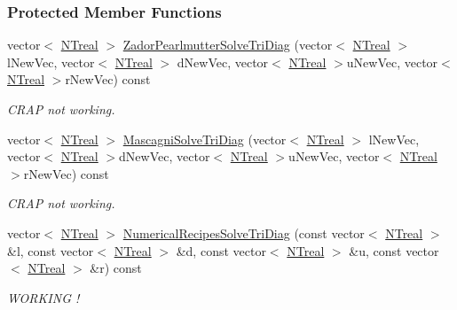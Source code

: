 \subsubsection*{Protected Member Functions}
\begin{DoxyCompactItemize}
\item 
vector$<$ \hyperlink{nt__types_8h_a814a97893e9deb1eedcc7604529ba80d}{NTreal} $>$ \hyperlink{class_n_t_b_p__membrane__compartment__sequence__o_a5d4fd9e3050991c450b24c7ff21dd1b6}{ZadorPearlmutterSolveTriDiag} (vector$<$ \hyperlink{nt__types_8h_a814a97893e9deb1eedcc7604529ba80d}{NTreal} $>$ lNewVec, vector$<$ \hyperlink{nt__types_8h_a814a97893e9deb1eedcc7604529ba80d}{NTreal} $>$ dNewVec, vector$<$ \hyperlink{nt__types_8h_a814a97893e9deb1eedcc7604529ba80d}{NTreal} $>$uNewVec, vector$<$ \hyperlink{nt__types_8h_a814a97893e9deb1eedcc7604529ba80d}{NTreal} $>$rNewVec) const 
\begin{DoxyCompactList}\small\item\em CRAP not working. \item\end{DoxyCompactList}\item 
vector$<$ \hyperlink{nt__types_8h_a814a97893e9deb1eedcc7604529ba80d}{NTreal} $>$ \hyperlink{class_n_t_b_p__membrane__compartment__sequence__o_a1d642d4a45e19c17473567250871ef13}{MascagniSolveTriDiag} (vector$<$ \hyperlink{nt__types_8h_a814a97893e9deb1eedcc7604529ba80d}{NTreal} $>$ lNewVec, vector$<$ \hyperlink{nt__types_8h_a814a97893e9deb1eedcc7604529ba80d}{NTreal} $>$dNewVec, vector$<$ \hyperlink{nt__types_8h_a814a97893e9deb1eedcc7604529ba80d}{NTreal} $>$uNewVec, vector$<$ \hyperlink{nt__types_8h_a814a97893e9deb1eedcc7604529ba80d}{NTreal} $>$rNewVec) const 
\begin{DoxyCompactList}\small\item\em CRAP not working. \item\end{DoxyCompactList}\item 
vector$<$ \hyperlink{nt__types_8h_a814a97893e9deb1eedcc7604529ba80d}{NTreal} $>$ \hyperlink{class_n_t_b_p__membrane__compartment__sequence__o_ad799e339507841f6df00ab82c2e43ac9}{NumericalRecipesSolveTriDiag} (const vector$<$ \hyperlink{nt__types_8h_a814a97893e9deb1eedcc7604529ba80d}{NTreal} $>$ \&l, const vector$<$ \hyperlink{nt__types_8h_a814a97893e9deb1eedcc7604529ba80d}{NTreal} $>$ \&d, const vector$<$ \hyperlink{nt__types_8h_a814a97893e9deb1eedcc7604529ba80d}{NTreal} $>$ \&u, const vector$<$ \hyperlink{nt__types_8h_a814a97893e9deb1eedcc7604529ba80d}{NTreal} $>$ \&r) const 
\begin{DoxyCompactList}\small\item\em WORKING ! \item\end{DoxyCompactList}\end{DoxyCompactItemize}
